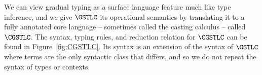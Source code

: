 We can view gradual typing as a surface language feature much like
type inference, and we give $\GSTLC$ its operational semantics by
translating it to a fully annotated core language -- sometimes called
the casting calculus -- called $\CGSTLC$. The syntax, typing rules,
and reduction relation for $\CGSTLC$ can be found in
Figure~\ref{fig:CGSTLC}. Its syntax is an extension of the syntax of
$\GSTLC$ where terms are the only syntactic class that differs, and so
we do not repeat the syntax of types or contexts.
\renewcommand{\GSiekdruleCXXvarName}[0]{\text{var}}
\renewcommand{\GSiekdruleCXXunitName}[0]{\text{unit}}
\renewcommand{\GSiekdruleCXXzeroName}[0]{\text{zero}}
\renewcommand{\GSiekdruleCXXsuccName}[0]{\text{succ}}
\renewcommand{\GSiekdruleCXXpairName}[0]{\times}
\renewcommand{\GSiekdruleCXXlamName}[0]{\to}
\renewcommand{\GSiekdruleCXXsndName}[0]{\times_{e_2}}
\renewcommand{\GSiekdruleCXXfstName}[0]{\times_{e_1}}
\renewcommand{\GSiekdruleCXXappName}[0]{\to_e}
\renewcommand{\GSiekdruleCXXcastName}[0]{\text{cast}}
\renewcommand{\GSiekdrulerdAXXvaluesName}{\text{values}}
\renewcommand{\GSiekdrulerdAXXcastIdName}{\text{id-atom}}
\renewcommand{\GSiekdrulerdAXXcastUName}{\text{id-U}}
\renewcommand{\GSiekdrulerdAXXsucceedName}{\text{succeed}}
\renewcommand{\GSiekdrulerdAXXcastArrowName}{\text{arrow}}
\renewcommand{\GSiekdrulerdAXXcastGroundName}{\text{expand}_1}
\renewcommand{\GSiekdrulerdAXXcastExpandName}{\text{expand}_2}
\renewcommand{\GSiekdrulerdAXXbetaName}{}
\renewcommand{\GSiekdrulerdAXXappOneName}{}
\renewcommand{\GSiekdrulerdAXXappTwoName}{}
\renewcommand{\GSiekdrulerdAXXfstName}{}
\renewcommand{\GSiekdrulerdAXXsndName}{}
\renewcommand{\GSiekdrulerdAXXpairOneName}{}
\renewcommand{\GSiekdrulerdAXXpairTwoName}{}
